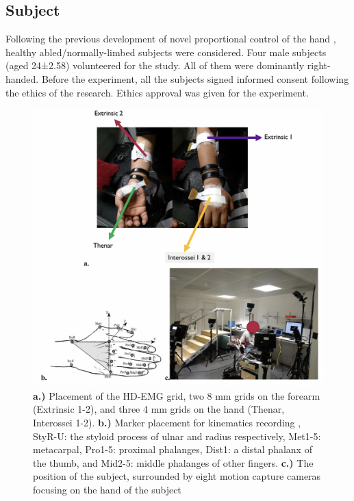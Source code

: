 \documentclass[conference]{IEEEtran}
\begin{document}
\subsection{Subject}
Following the previous development of novel proportional control of the hand \cite{b9}\cite{b16}, healthy 
abled/normally-limbed subjects were considered. Four male subjects (aged 24±2.58) volunteered for the 
study. All of them were dominantly right-handed. Before the experiment, all the subjects signed informed 
consent following the ethics of the research. Ethics approval was given for the experiment.
\begin{figure}[htbp]
\centerline{\includegraphics[width=\columnwidth]{figure1.png}}
\caption{\textbf{a.)} Placement of the HD-EMG grid, two 8 mm grids on the forearm (Extrinsic 1-2), and three 4 mm grids on the hand (Thenar, Interossei 1-2). \textbf{b.)} Marker placement for kinematics recording \cite{b25}, StyR-U: the styloid process of ulnar and radius respectively, Met1-5: metacarpal, Pro1-5: proximal phalanges, Dist1: a distal phalanx of the thumb, and Mid2-5: middle phalanges of other fingers. \textbf{c.)} The position of the subject, surrounded by eight motion capture cameras focusing on the hand of the subject}
\label{figure1}
\end{figure}
\end{document}
